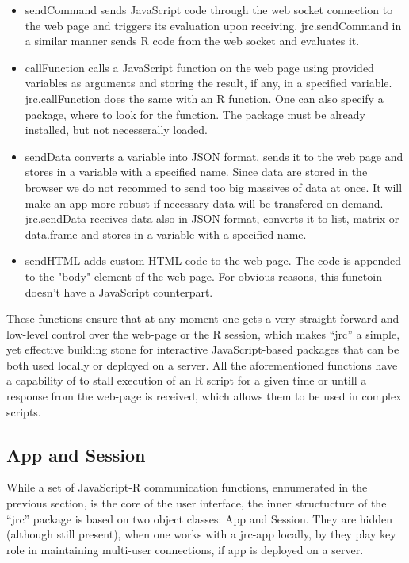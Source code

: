\documentclass[twocolumn,10pt]{article}
\begin{document}
\begin{itemize}
\item sendCommand sends JavaScript code through the web socket connection to the web page and triggers its evaluation upon receiving. jrc.sendCommand in a similar manner sends R code from the web socket and evaluates it.

\item callFunction calls a JavaScript function on the web page using provided variables as arguments and storing the result, if any, in a specified variable. jrc.callFunction does the same with an R function. One can also specify a package, where to look for the function. The package must be already installed, but not necesserally loaded.

\item sendData converts a variable into JSON format, sends it to the web page and stores in a variable with a specified name. Since data are stored in the browser we do not recommed to send too big massives of data at once. It will make an app more robust if necessary data will be transfered on demand. jrc.sendData receives data also in JSON format, converts it to list, matrix or data.frame and stores in a variable with a specified name.

\item sendHTML adds custom HTML code to the web-page. The code is appended to the "body" element of the web-page. For obvious reasons, this functoin doesn't have a JavaScript counterpart.
\end{itemize}

These functions ensure that at any moment one gets a very straight forward and low-level control over the web-page or the R session, which makes ``jrc'' a simple, yet effective building stone for interactive JavaScript-based packages that can be both used locally or deployed on a server. All the aforementioned functions have a capability of to stall execution of an R script for a given time or untill a response from the web-page is received, which allows them to be used in complex scripts.

\subsection{App and Session}

While a set of JavaScript-R communication functions, ennumerated in the previous section, is the core of the user interface, the inner structucture of the ``jrc'' package is based on two object classes: App and Session. They are hidden (although still present), when one works with a jrc-app locally, by they play key role in maintaining multi-user connections, if app is deployed on a server.
\end{document}
